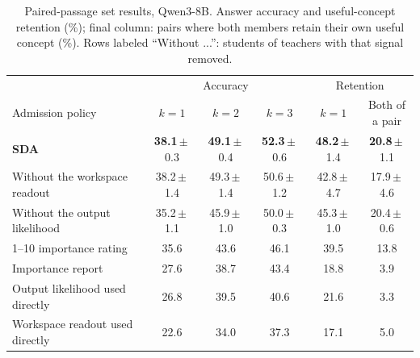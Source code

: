 \begin{table}[t]
\centering
\caption{Paired-passage set results, Qwen3-8B. Answer accuracy and useful-concept retention (\%); final column:
pairs where both members retain their own useful concept (\%). Rows labeled ``Without ...'': students of
teachers with that signal removed.}
\label{tab:crosspair}
\small
\setlength{\tabcolsep}{5pt}
\begin{tabular}{lccccc}
\toprule
& \multicolumn{3}{c}{Accuracy} & \multicolumn{2}{c}{Retention} \\
\cmidrule(lr){2-4}\cmidrule(lr){5-6}
Admission policy & $k=1$ & $k=2$ & $k=3$ & $k=1$ & \shortstack{Both of\\a pair} \\
\midrule
\textbf{SDA} & \textbf{38.1}\,$\pm$\,0.3 & \textbf{49.1}\,$\pm$\,0.4 & \textbf{52.3}\,$\pm$\,0.6 & \textbf{48.2}\,$\pm$\,1.4 & \textbf{20.8}\,$\pm$\,1.1 \\
\addlinespace
Without the workspace readout & 38.2\,$\pm$\,1.4 & 49.3\,$\pm$\,1.4 & 50.6\,$\pm$\,1.2 & 42.8\,$\pm$\,4.7 & 17.9\,$\pm$\,4.6 \\
Without the output likelihood & 35.2\,$\pm$\,1.1 & 45.9\,$\pm$\,1.0 & 50.0\,$\pm$\,0.3 & 45.3\,$\pm$\,1.0 & 20.4\,$\pm$\,0.6 \\
1--10 importance rating \citep{park2023generative} & 35.6 & 43.6 & 46.1 & 39.5 & 13.8 \\
Importance report & 27.6 & 38.7 & 43.4 & 18.8 & 3.9 \\
Output likelihood used directly & 26.8 & 39.5 & 40.6 & 21.6 & 3.3 \\
Workspace readout used directly & 22.6 & 34.0 & 37.3 & 17.1 & 5.0 \\
\bottomrule
\end{tabular}
\end{table}
